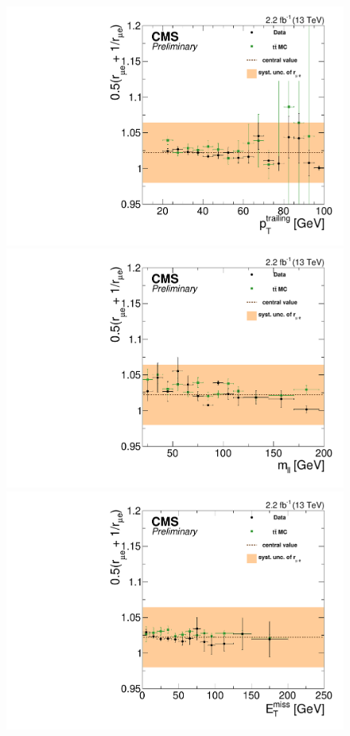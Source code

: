 \begin{figure}[htbp]
\begin{minipage}[t]{0.3\textwidth}
    \includegraphics[width=\textwidth]{bkgd/figs/rSFOFFromRMuE_ZPeakControlForward_Run2015_25ns_TrailingPt_None.pdf}
  \end{minipage}
  \begin{minipage}[t]{0.3\textwidth}
    \includegraphics[width=\textwidth]{bkgd/figs/rSFOFFromRMuE_ZPeakControlForward_Run2015_25ns_Mll_None.pdf}
  \end{minipage}
  \begin{minipage}[t]{0.3\textwidth}
    \includegraphics[width=\textwidth]{bkgd/figs/rSFOFFromRMuE_ZPeakControlForward_Run2015_25ns_MET_None.pdf}

\end{minipage}
\end{figure}
